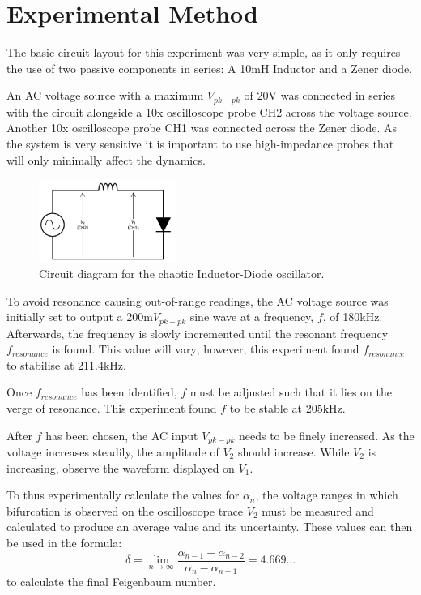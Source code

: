 \documentclass[10pt,twocolumn,letterpaper]{article}
\begin{document}
\section{Experimental Method}

The basic circuit layout for this experiment was very simple, as it only requires the use of two passive components in series:  A 10mH Inductor and a Zener diode. 

An AC voltage source with a maximum \(V_{pk-pk}\) of 20V was connected in series with the circuit alongside a 10x oscilloscope probe CH2 across the voltage source.  Another 10x oscilloscope probe CH1 was connected across the Zener diode.  As the system is very sensitive it is important to use high-impedance probes that will only minimally affect the dynamics.

\begin{figure}[h]
  \centering
  \includegraphics[width=0.4\textwidth]{figures/lab.png}
  \caption{Circuit diagram for the chaotic Inductor-Diode oscillator.}
\end{figure}

To avoid resonance causing out-of-range readings, the AC voltage source was initially set to output a  200m\(V_{pk-pk}\) sine wave at a frequency, \(f\), of 180kHz.  Afterwards, the frequency is slowly incremented until the resonant frequency \(f_{resonance}\) is found.  This value will vary; however, this experiment found \(f_{resonance}\) to stabilise at 211.4kHz.

Once \(f_{resonance}\) has been identified, \(f\) must be adjusted such that it lies on the verge of resonance. This experiment found \(f\) to be stable at 205kHz.

After \(f\) has been chosen, the AC input \(V_{pk-pk}\) needs to be finely increased.  As the voltage increases steadily, the amplitude of \(V_2\) should increase.  While \(V_2\) is increasing, observe the waveform displayed on \(V_1\).

To thus experimentally calculate the values for \(\alpha_{n}\), the voltage ranges in which bifurcation is observed on the oscilloscope trace \(V_2\) must be measured and calculated to produce an average value and its uncertainty.  These values can then be used in the formula:  
\[\delta = \lim_{n \to \infty }\frac{\alpha_{n-1} - \alpha_{n-2} }{\alpha_{n} - \alpha_{n-1}} = 4.669...\]
to calculate the final Feigenbaum number.
\\
\\
\\
\end{document}

